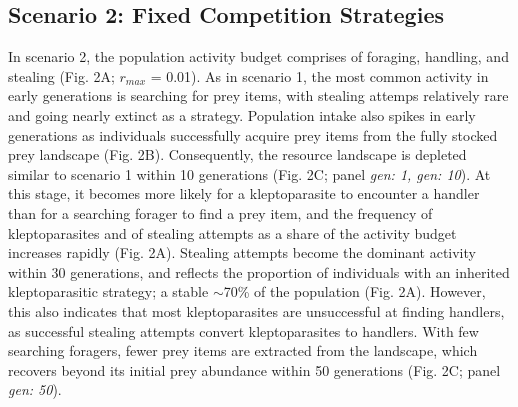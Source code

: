 \documentclass[11pt]{article}
\begin{document}
\subsection{Scenario 2: Fixed Competition Strategies}

In scenario 2, the population activity budget comprises of foraging, handling, and stealing (Fig. 2A; $r_{max}$ = 0.01).
As in scenario 1, the most common activity in early generations is searching for prey items, with stealing attemps relatively rare and going nearly extinct as a strategy.
Population intake also spikes in early generations as individuals successfully acquire prey items from the fully stocked prey landscape (Fig. 2B).
Consequently, the resource landscape is depleted similar to scenario 1 within 10 generations (Fig. 2C; panel \textit{gen: 1, gen: 10}).
At this stage, it becomes more likely for a kleptoparasite to encounter a handler than for a searching forager to find a prey item, and the frequency of kleptoparasites and of stealing attempts as a share of the activity budget increases rapidly (Fig. 2A).
Stealing attempts become the dominant activity within 30 generations, and reflects the proportion of individuals with an inherited kleptoparasitic strategy; a stable $\sim$70\% of the population (Fig. 2A).
However, this also indicates that most kleptoparasites are unsuccessful at finding handlers, as successful stealing attempts convert kleptoparasites to handlers.
With few searching foragers, fewer prey items are extracted from the landscape, which recovers beyond its initial prey abundance within 50 generations (Fig. 2C; panel \textit{gen: 50}).
\end{document}
